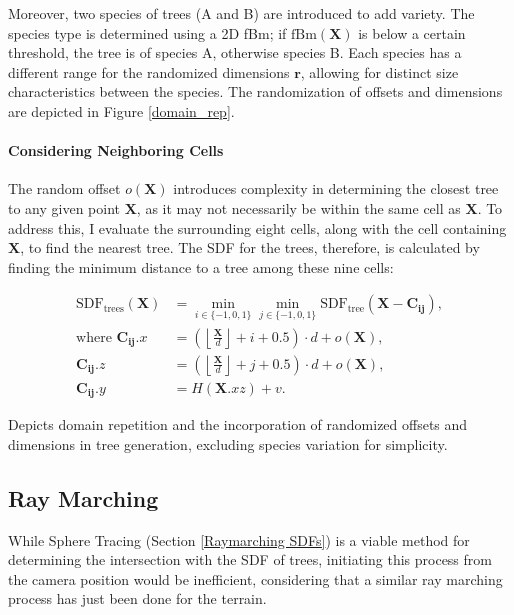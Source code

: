 Moreover, two species of trees (A and B) are introduced to add variety. The species type is determined using a 2D fBm; if $\text{fBm}(\mathbf{X})$ is below a certain threshold, the tree is of species A, otherwise species B. Each species has a different range for the randomized dimensions $\mathbf{r}$, allowing for distinct size characteristics between the species. The randomization of offsets and dimensions are depicted in Figure \ref{domain_rep}.

\paragraph{Considering Neighboring Cells}
The random offset $o(\mathbf{X})$ introduces complexity in determining the closest tree to any given point $\mathbf{X}$, as it may not necessarily be within the same cell as $\mathbf{X}$. To address this, I evaluate the surrounding eight cells, along with the cell containing $\mathbf{X}$, to find the nearest tree. The SDF for the trees, therefore, is calculated by finding the minimum distance to a tree among these nine cells:

\begin{equation}
\begin{aligned}
\text{SDF}_\text{trees}(\mathbf{X}) &= \min_{i\in\{-1,0,1\}}\min_{j\in\{-1,0,1\}}\text{SDF}_\text{tree}(\mathbf{X} - \mathbf{C_{ij}}), \\
\text{where } \mathbf{C_{ij}}.x & = \left(\left\lfloor \frac{\mathbf{X}}{d} \right\rfloor + i + 0.5\right) \cdot d + o(\mathbf{X}), \\
\mathbf{C_{ij}}.z & = \left(\left\lfloor \frac{\mathbf{X}}{d} \right\rfloor + j + 0.5\right) \cdot d + o(\mathbf{X}), \\
\mathbf{C_{ij}}.y &= H(\mathbf{X}.{xz}) + v.
\end{aligned}
\end{equation}

{Depicts domain repetition and the incorporation of randomized offsets and dimensions in tree generation, excluding species variation for simplicity.}

\subsection{Ray Marching}
\label{Tree Ray Marching}

While Sphere Tracing (Section \ref{Raymarching SDFs}) is a viable method for determining the intersection with the SDF of trees, initiating this process from the camera position would be inefficient, considering that a similar ray marching process has just been done for the terrain.

